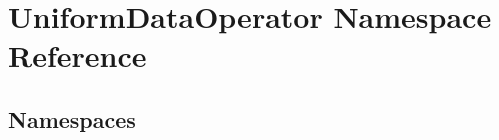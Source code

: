 \hypertarget{namespace_uniform_data_operator}{}\section{Uniform\+Data\+Operator Namespace Reference}
\label{namespace_uniform_data_operator}
\subsection*{Namespaces}
\begin{DoxyCompactItemize}
\end{DoxyCompactItemize}
